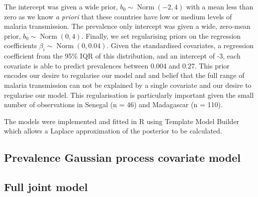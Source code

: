 \documentclass[10pt,letterpaper]{article}
\begin{document}
%
%
%
%
%
%
%

The intercept was given a wide prior, $b_0 \sim \operatorname{Norm}(-2, 4)$ with a mean less than zero as we know \emph{a priori} that these countries have low or medium levels of malaria transmission.
The prevalence only intercept was given a wide, zero-mean prior, $b_0 \sim \operatorname{Norm}(0, 4)$. %
Finally, we set regularising priors on the regression coefficients $\beta_i \sim \operatorname{Norm}(0, 0.04)$. 
Given the standardised covariates, a regression coefficient from the 95\% IQR of this distribution, and an intercept of -3, each covariate is able to predict prevalences between 0.004 and 0.27. 
This prior encodes our desire to regularise our model and and belief that the full range of malaria transmission can not be explained by a single covariate and our desire to regularise our model.
This regularisation is particularly important given the small number of observations in Senegal (n = 46) and Madagascar (n = 110).

The models were implemented and fitted in R \cite{R} using Template Model Builder \cite{TMB} which allows a Laplace approximation of the posterior to be calculated.

\subsection*{Prevalence Gaussian process covariate model}


\subsection*{Full joint model}
\end{document}
